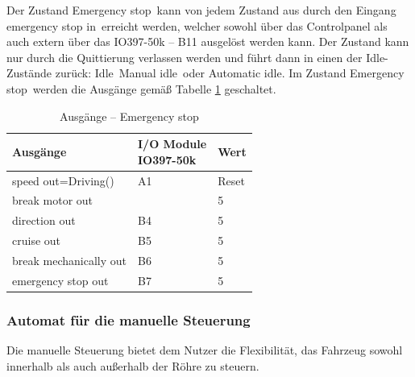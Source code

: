 Der Zustand \frqq Emergency stop\flqq\ kann von jedem Zustand aus durch den Eingang \frqq emergency stop in\flqq\ erreicht werden, welcher sowohl über das Controlpanel als auch extern über das IO397-50k – B11 ausgelöst werden kann. Der Zustand kann nur durch die Quittierung verlassen werden und führt dann in einen der Idle-Zustände zurück: \frqq Idle\flqq\ \frqq Manual idle\flqq\ oder \frqq Automatic idle\flqq. Im Zustand \frqq Emergency stop\flqq\ werden die Ausgänge gemäß Tabelle \ref{Automat_man:tab:z_Emergency_stop} geschaltet.


\pagebreak[1]
\begin{table}[!ht]
	\centering
	\caption{Ausgänge – Emergency stop}
	\label{Automat_man:tab:z_Emergency_stop}
	\begin{tabular}{lll}
		\hline
		\textbf{Ausgänge}                           & \makecell{\textbf{I/O Module}         \\ \textbf{IO397-50k}}                 & \textbf{Wert} \\ \hline
		\multicolumn{1}{l|}{speed out=Driving()}    & \multicolumn{1}{l|}{A1}       & Reset \\
		\multicolumn{1}{l|}{break motor out}        & \multicolumn{1}{l|}{}         & 5     \\
		\multicolumn{1}{l|}{direction out}          & \multicolumn{1}{l|}{B4}       & 5     \\
		\multicolumn{1}{l|}{cruise out}             & \multicolumn{1}{l|}{B5}       & 5     \\
		\multicolumn{1}{l|}{break mechanically out} & \multicolumn{1}{l|}{B6}       & 5     \\
		\multicolumn{1}{l|}{emergency stop out}     & \multicolumn{1}{l|}{B7}       & 5     \\ \hline
	\end{tabular}
\end{table}
\pagebreak[1]










\subsubsection{Automat für die manuelle Steuerung}
\label{Automatensteuerung:Automat_man}

Die manuelle Steuerung bietet dem Nutzer die Flexibilität, das Fahrzeug sowohl innerhalb als auch außerhalb der Röhre zu steuern.\\

